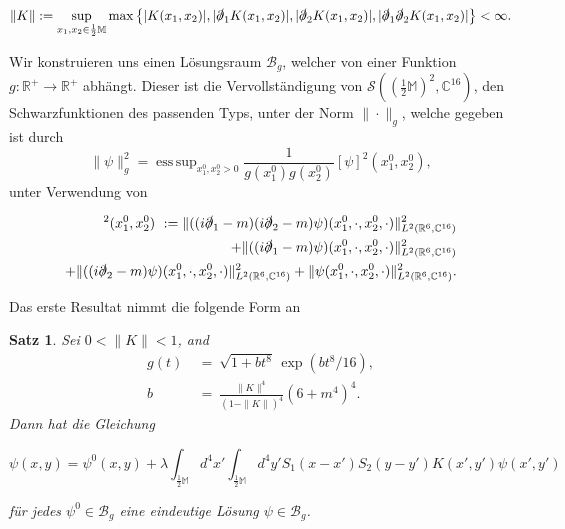 \documentclass[a4paper,12pt]{article}
\newtheorem{satz}{Satz}
\DeclareMathOperator*{\esssup}{ess \, sup}
\begin{document}
\begin{equation}
		\| K \| := \sup_{x_1, x_2 \in \frac{1}{2}\mathbb{M} } \max \left\{ |K(x_1,x_2)|, |\slashed{\partial}_1 K(x_1,x_2)|, |\slashed{\partial}_2 K(x_1,x_2)|, |\slashed{\partial}_1 \slashed{\partial}_2 K(x_1,x_2)|\right\} < \infty.
	\label{eq:normk}
\end{equation}

Wir konstruieren uns einen Lösungsraum \(\mathscr{B}_g\), 
welcher von einer Funktion \(g:\mathbb{R}^+\rightarrow\mathbb{R}^+\) abhängt. Dieser
ist die Vervollständigung von \(\mathscr{S}\left(\left(\frac{1}{2}\mathbb{M}\right)^2,\mathbb{C}^{16}\right)\), den Schwarzfunktionen des passenden Typs,
unter der Norm \(\|\cdot\|_g\),  welche gegeben ist durch
\begin{equation}
	\| \psi \|^2_g = \esssup_{x_1^0,x_2^0 >0} \frac{1}{g(x_1^0)g(x_2^0)} [\psi]^2(x_1^0,x_2^0),
\label{eq:normpsi}
\end{equation}
unter Verwendung von

\begin{align}
	[\psi]^2(x_1^0,x_2^0) ~:= \| ((i\slashed{\partial}_{1}-m)(i\slashed{\partial}_{2}-m) \psi)(x_1^0, \cdot, x_2^0,\cdot)\|^2_{L^2(\mathbb{R}^6,\mathbb{C}^{16})}\\
	+\| ((i\slashed{\partial}_{1}-m) \psi)(x_1^0, \cdot, x_2^0,\cdot)\|^2_{L^2(\mathbb{R}^6,\mathbb{C}^{16})}\\
	+\| ((i\slashed{\partial}_{2}-m) \psi)(x_1^0, \cdot, x_2^0,\cdot)\|^2_{L^2(\mathbb{R}^6,\mathbb{C}^{16})}
	+\|  \psi(x_1^0, \cdot, x_2^0,\cdot)\|^2_{L^2(\mathbb{R}^6,\mathbb{C}^{16})}.
\label{eq:spatialnorm}
\end{align}

Das erste Resultat nimmt die folgende Form an

\begin{satz}
	Sei  $0 < \| K \| < 1$,  and
	\begin{align} 
		g(t)& ~=~ \sqrt{1+b t^8}\, \exp(b t^8/16),	\label{eq:defg}\\
    		b& ~=~ \frac{\|K\|^4}{(1-\|K\|)^4} \left(6+m^4\right)^4. \label{eq:defb}
\end{align}
	Dann hat die Gleichung 
	
\begin{equation}
\psi(x,y)=\psi^0(x,y) + \lambda \int_{\frac{1}{2}\mathbb{M}} d^4 x' \int_{\frac{1}{2}\mathbb{M}} d^4y' S_1(x-x')S_2(y-y') K(x',y') \psi(x',y')
\end{equation}
	
	 für jedes $\psi^0 \in \mathscr{B}_g$ eine eindeutige Lösung $\psi \in \mathscr{B}_g$.
\end{satz}
\end{document}
